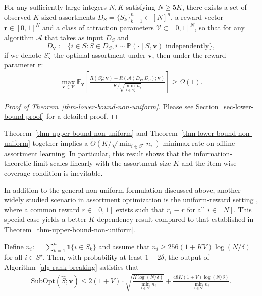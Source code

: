 \documentclass[10pt, letterpaper]{article}
\begin{document}
\begin{theorem}\label{thm-lower-bound-non-uniform}
For any sufficiently large integers $N,K$ satisfying $N \geq 5K$, there exists a set of observed $K$-sized assortments $D_S = \{S_k\}_{k=1}^n \subset [N]^n$, a reward vector $\bm r\in [0,1]^N$ and a class of attraction parameters $\mathcal{V} \subset [0,1]^N$, so that for any algorithm $\mathcal{A}$ that takes as input $D_S$ and $$D_{\bm{v}} := \{i \in S : S \in D_S, i \sim \mathbb{P}(\cdot \mid S, \bm{v}) \text{ independently}\},$$ if we denote $S^\star_{\bm{v}}$ the optimal assortment under $\bm{v}$, then under the reward parameter $\bm r$:
\begin{align*}
\max_{\bm{v} \in \mathcal{V}} \mathbb{E}_{\bm{v}} \left[  \frac{ R(S_{\bm{v}}^\star; \bm{v}) - R(\mathcal{A}(D_{\bm{v}}, D_S); \bm{v}) }{K/ \sqrt{\min_{i \in S^\star_{\bm{v}}} n_i}} \right] \ge \Omega(1).
\end{align*}
\end{theorem}

\begin{proof}[Proof of Theorem~\ref{thm-lower-bound-non-uniform}]
    Please see Section~\ref{sec-lower-bound-proof} for a detailed proof.
\end{proof}
Theorem~\ref{thm-upper-bound-non-uniform} and Theorem~\ref{thm-lower-bound-non-uniform} together implies a $\widetilde{\Theta}({K}/{\sqrt{\min_{i\in S^\star} n_i}})$ minimax rate on offline assortment learning. 
In particular, this result shows that the information-theoretic limit scales linearly with the assortment size $K$ and the item-wise coverage condition is inevitable.

In addition to the general non-uniform formulation discussed above, another widely studied scenario in assortment optimization is the uniform-reward setting \citep{oh2021multinomial, perivier2022dynamic, lee2024nearly}, where a common reward $r \in [0,1]$ exists such that $r_i \equiv r$ for all $i \in [N]$.  This special case yields a better $K$-dependency result compared to that established in Theorem~\ref{thm-upper-bound-non-uniform}.


\begin{theorem}\label{thm-upper-bound-uniform}
Define $n_i: = \sum_{k = 1}^n \bm{1}\{i\in S_k\}$ and assume that $n_i\geq 256(1+KV)\log(N/\delta)$ for all $i\in S^\star$. 
Then, with probability at least $1-2\delta$, the output of Algorithm~\ref{alg-rank-breaking} satisfies that
\begin{align*}
        \mathrm{SubOpt}( \widehat{S}; \bm{v})  \le  2(1+V)\cdot \sqrt{\frac{K\log (N/\delta)}{\min_{i\in S^\star}n_i}} + \frac{48K(1+V)\log(N/\delta)}{\min_{i\in S^\star} n_i}.
\end{align*}
\end{theorem}
\end{document}
